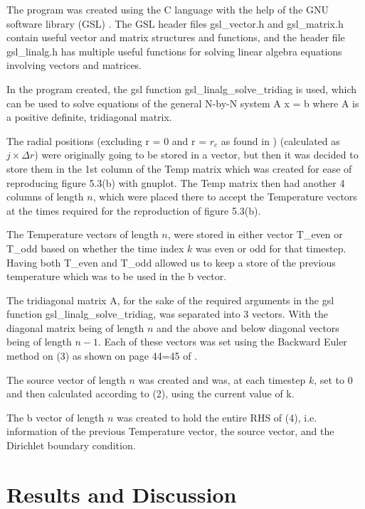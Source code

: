 \documentclass{article}
\begin{document}
The program was created using the C language with the help of the GNU software library (GSL) \cite{GSL}. The GSL header files gsl\_vector.h and gsl\_matrix.h contain useful vector and matrix structures and functions, and the header file gsl\_linalg.h has multiple useful functions for solving linear algebra equations involving vectors and matrices.

In the program created, the gsl function gsl\_linalg\_solve\_tridiag is used, which can be used to solve equations of the general N-by-N system A x = b where A is a positive definite, tridiagonal matrix\cite{Linalg}.

The radial positions (excluding r = 0 and r = $r_c$ as found in \cite{Olsen-Kettle}) (calculated as $j \times \Delta r$) were originally going to be stored in a vector, but then it was decided to store them in the 1st column of the Temp matrix which was created for ease of reproducing figure 5.3(b) with gnuplot. The Temp matrix then had another 4 columns of length $n$, which were placed there to accept the Temperature vectors at the times required for the reproduction of figure 5.3(b).

The Temperature vectors of length $n$, were stored in either vector T\_even or T\_odd based on whether the time index $k$ was even or odd for that timestep. Having both T\_even and T\_odd allowed us to keep a store of the previous temperature which was to be used in the b vector.

The tridiagonal matrix A, for the sake of the required arguments in the gsl function gsl\_linalg\_solve\_tridiag, was separated into 3 vectors. With the diagonal matrix being of length $n$ and the above and below diagonal vectors being of length $n-1$. Each of these vectors was set using the Backward Euler method on (3) as shown on page 44=45 of \cite{Olsen-Kettle}.

The source vector of length $n$ was created and was, at each timestep $k$, set to 0 and then calculated according to (2), using the current value of k.

The b vector of length $n$ was created to hold the entire RHS of (4), i.e. information of the previous Temperature vector, the source vector, and the Dirichlet boundary condition.







\section{Results and Discussion}
\end{document}
